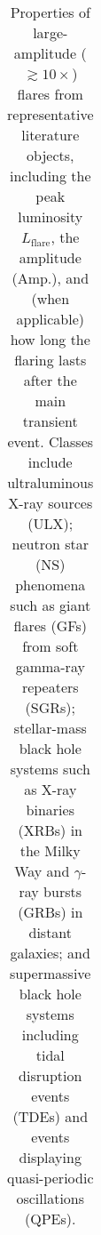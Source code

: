 \documentclass{nature_plusfigure}
\newcommand{\at}{AT2022tsd}
\begin{document}
\begin{table}
\begin{tabular}{llllll}
    \hline\hline
    \end{tabular}
    \caption{Properties of large-amplitude ($\gtrsim10\times$) flares from representative literature objects, including the peak luminosity $L_\mathrm{flare}$, the amplitude (Amp.), and (when applicable) how long the flaring lasts after the main transient event.
    Classes include ultraluminous X-ray sources (ULX); neutron star (NS) phenomena such as giant flares (GFs) from soft gamma-ray repeaters (SGRs); stellar-mass black hole systems such as X-ray binaries (XRBs) in the Milky Way and $\gamma$-ray bursts (GRBs) in distant galaxies; and supermassive black hole systems including tidal disruption events (TDEs) and events displaying quasi-periodic oscillations (QPEs).}%
    \label{tab:flaring-classes}
\end{table}

\clearpage


%
%
\end{document}
